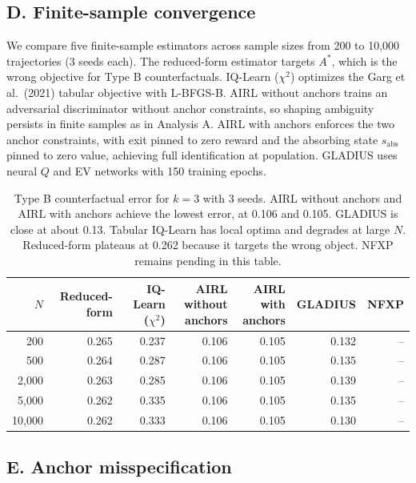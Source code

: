 \documentclass[11pt]{article}
\begin{document}
\subsection{D. Finite-sample convergence}

We compare five finite-sample estimators across sample sizes from 200 to 10{,}000 trajectories (3 seeds each). The reduced-form estimator targets $A^*$, which is the wrong objective for Type B counterfactuals. IQ-Learn ($\chi^2$) optimizes the Garg et al.\ (2021) tabular objective with L-BFGS-B. AIRL without anchors trains an adversarial discriminator without anchor constraints, so shaping ambiguity persists in finite samples as in Analysis A. AIRL with anchors enforces the two anchor constraints, with exit pinned to zero reward and the absorbing state $s_{\mathrm{abs}}$ pinned to zero value, achieving full identification at population. GLADIUS uses neural $Q$ and EV networks with 150 training epochs.

\begin{table}[H]
\centering
\small
\setlength{\tabcolsep}{5pt}
\begin{tabular}{rrrrrrr}
\toprule
$N$ & Reduced-form & IQ-Learn ($\chi^2$) & \shortstack{AIRL without\\ anchors} & \shortstack{AIRL with\\ anchors} & GLADIUS & NFXP \\
\midrule
200      & 0.265 & 0.237 & 0.106 & 0.105 & 0.132 & -- \\
500      & 0.264 & 0.287 & 0.106 & 0.105 & 0.135 & -- \\
2{,}000  & 0.263 & 0.285 & 0.106 & 0.105 & 0.139 & -- \\
5{,}000  & 0.262 & 0.335 & 0.106 & 0.105 & 0.135 & -- \\
10{,}000 & 0.262 & 0.333 & 0.106 & 0.105 & 0.130 & -- \\
\bottomrule
\end{tabular}
\caption{Type B counterfactual error for $k = 3$ with 3 seeds. AIRL without anchors and AIRL with anchors achieve the lowest error, at 0.106 and 0.105. GLADIUS is close at about 0.13. Tabular IQ-Learn has local optima and degrades at large $N$. Reduced-form plateaus at 0.262 because it targets the wrong object. NFXP remains pending in this table.}
\label{tab:samplesize}
\end{table}

\subsection{E. Anchor misspecification}
\end{document}
